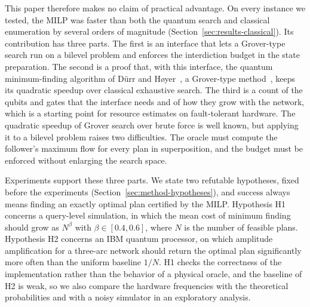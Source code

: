 This paper therefore makes no claim of practical advantage. On every instance we tested, the MILP was faster than both the quantum search and classical enumeration by several orders of magnitude (Section~\ref{sec:results-classical}). Its contribution has three parts. The first is an interface that lets a Grover-type search run on a bilevel problem and enforces the interdiction budget in the state preparation. The second is a proof that, with this interface, the quantum minimum-finding algorithm of Dürr and Høyer~\cite{durr1996}, a Grover-type method~\cite{grover1996,bbht1998}, keeps its quadratic speedup over classical exhaustive search. The third is a count of the qubits and gates that the interface needs and of how they grow with the network, which is a starting point for resource estimates on fault-tolerant hardware. The quadratic speedup of Grover search over brute force is well known, but applying it to a bilevel problem raises two difficulties. The oracle must compute the follower's maximum flow for every plan in superposition, and the budget must be enforced without enlarging the search space.

Experiments support these three parts. We state two refutable hypotheses, fixed before the experiments (Section~\ref{sec:method-hypotheses}), and success always means finding an exactly optimal plan certified by the MILP. Hypothesis H1 concerns a query-level simulation, in which the mean cost of minimum finding should grow as $N^{\beta}$ with $\beta\in[0.4,0.6]$, where $N$ is the number of feasible plans. Hypothesis H2 concerns an IBM quantum processor, on which amplitude amplification for a three-arc network should return the optimal plan significantly more often than the uniform baseline $1/N$. H1 checks the correctness of the implementation rather than the behavior of a physical oracle, and the baseline of H2 is weak, so we also compare the hardware frequencies with the theoretical probabilities and with a noisy simulator in an exploratory analysis.

